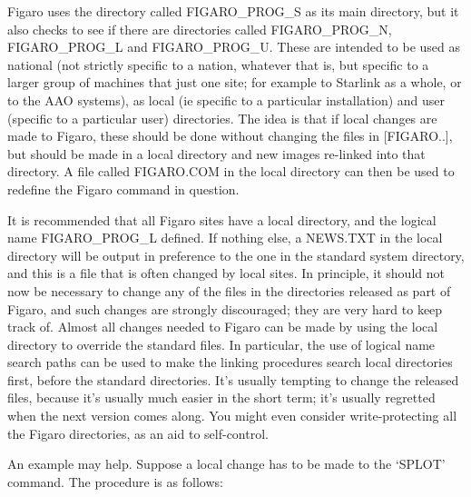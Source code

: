 Figaro uses the directory called FIGARO\_PROG\_S as its main directory,
but it also checks to see if there are directories called FIGARO\_PROG\_N,
FIGARO\_PROG\_L and FIGARO\_PROG\_U. These are intended to be used as
national (not strictly specific to a nation, whatever that is, but specific to
a larger group of machines that just one site; for example to Starlink as a
whole, or to the AAO systems), as local (ie specific to a particular
installation) and user (specific to a particular user) directories.  The
idea is that if local changes are made to Figaro, these should be done
without changing the files in [FIGARO..], but should be made in a local
directory and new images re-linked into that directory. A file called
FIGARO.COM in the local directory can then be used to redefine the Figaro
command in question.

It is recommended that all Figaro sites have a local directory, and the
logical name FIGARO\_\-PROG\_L defined. If nothing else, a NEWS.TXT in the
local directory will be output in preference to the one in the standard
system directory, and this is a file that is often changed by local sites. In
principle, it should not now be necessary to change any of the files in the
directories released as part of Figaro, and such changes are strongly
discouraged; they are very hard to keep track of. Almost all changes needed
to Figaro can be made by using the local directory to override the standard
files. In particular, the use of logical name search paths can be used to
make the linking procedures search local directories first, before the
standard directories.  It's usually tempting to change the released files,
because it's usually much easier in the short term; it's usually regretted
when the next version comes along. You might even consider write-protecting
all the Figaro directories, as an aid to self-control.

An example may help. Suppose a local change has to be made to the `SPLOT'
command. The procedure is as follows:

